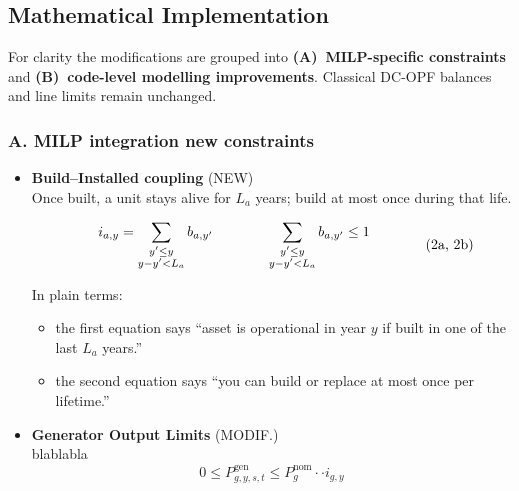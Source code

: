 \subsection{Mathematical Implementation}
\label{ssec:MILP_implementation}

For clarity the modifications are grouped into  
\textbf{(A)~MILP-specific constraints} and  
\textbf{(B)~code-level modelling improvements}.  
Classical DC-OPF balances and line limits remain unchanged. \cite{wood2013power}

\subsubsection*{A.   MILP integration new constraints}

\begin{itemize}
    \item \textbf{Build–Installed coupling} (NEW)\\
    Once built, a unit stays alive for $L_a$ years; build at most once during that life.
        
        \begin{equation}
            \setlength{\arraycolsep}{2em}
            \begin{array}{rlrl}
                i_{a,y} = \displaystyle \sum_{\substack{y' \le y \\ y - y' < L_a}} b_{a,y'} 
                & \displaystyle \sum_{\substack{y' \le y \\ y - y' < L_a}} b_{a,y'} \le 1
            \end{array}
            \tag{2a, 2b}
            \label{eq:build_install_new}
        \end{equation}
        \addtocounter{equation}{1}  %
        In plain terms:
        \begin{itemize}
            \item the first equation says “asset is operational in year $y$ if built in one of the last $L_a$ years.”  
            \item the second equation says “you can build or replace at most once per lifetime.”
        \end{itemize}


    \item \textbf{Generator Output Limits} (MODIF.)\\
    blablabla
    \begin{equation}
    0 \leq P^{\text{gen}}_{g,y,s,t} 
    \leq P^{\text{nom}}_{g} \cdot \cdot i_{g,y}
    \end{equation}


\end{itemize}
